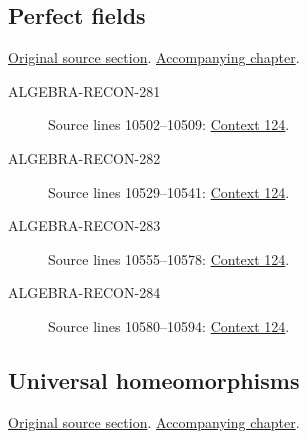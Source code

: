 \subsection{Perfect fields}
\hypertarget{algebra-source-section-perfect-fields}{}
\noindent\href{https://github.com/stacks/stacks-project/blob/a04446e57ec1fbc252a871afcec7752fb2807b14/algebra.tex\#L10482}{Original source section}. \href{algebra.pdf\#nameddest=section-perfect-fields}{Accompanying chapter}.

\begin{description}
\item[ALGEBRA-RECON-281] Source lines 10502--10509: \hyperlink{algebra-context-124}{Context 124}.
\item[ALGEBRA-RECON-282] Source lines 10529--10541: \hyperlink{algebra-context-124}{Context 124}.
\item[ALGEBRA-RECON-283] Source lines 10555--10578: \hyperlink{algebra-context-124}{Context 124}.
\item[ALGEBRA-RECON-284] Source lines 10580--10594: \hyperlink{algebra-context-124}{Context 124}.
\end{description}

\subsection{Universal homeomorphisms}
\hypertarget{algebra-source-section-universal-homeomorphism}{}
\noindent\href{https://github.com/stacks/stacks-project/blob/a04446e57ec1fbc252a871afcec7752fb2807b14/algebra.tex\#L10604}{Original source section}. \href{algebra.pdf\#nameddest=section-universal-homeomorphism}{Accompanying chapter}.

